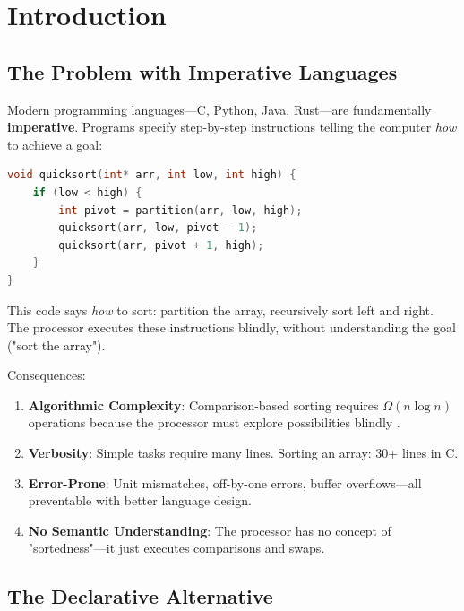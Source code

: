 \documentclass[twocolumn,10pt]{article}
\theoremstyle{definition}
\theoremstyle{remark}
\begin{document}
\tableofcontents

\section{Introduction}
\label{sec:introduction}

\subsection{The Problem with Imperative Languages}

Modern programming languages—C, Python, Java, Rust—are fundamentally \textbf{imperative}. Programs specify step-by-step instructions telling the computer \emph{how} to achieve a goal:

\begin{lstlisting}[language=C,caption={Imperative quicksort in C}]
void quicksort(int* arr, int low, int high) {
    if (low < high) {
        int pivot = partition(arr, low, high);
        quicksort(arr, low, pivot - 1);
        quicksort(arr, pivot + 1, high);
    }
}
\end{lstlisting}

This code says \emph{how} to sort: partition the array, recursively sort left and right. The processor executes these instructions blindly, without understanding the goal ("sort the array").

Consequences:
\begin{enumerate}
    \item \textbf{Algorithmic Complexity}: Comparison-based sorting requires $\Omega(n \log n)$ operations because the processor must explore possibilities blindly \citep{cormen2009}.

    \item \textbf{Verbosity}: Simple tasks require many lines. Sorting an array: 30+ lines in C.

    \item \textbf{Error-Prone}: Unit mismatches, off-by-one errors, buffer overflows—all preventable with better language design.

    \item \textbf{No Semantic Understanding}: The processor has no concept of "sortedness"—it just executes comparisons and swaps.
\end{enumerate}

\subsection{The Declarative Alternative}
\end{document}

